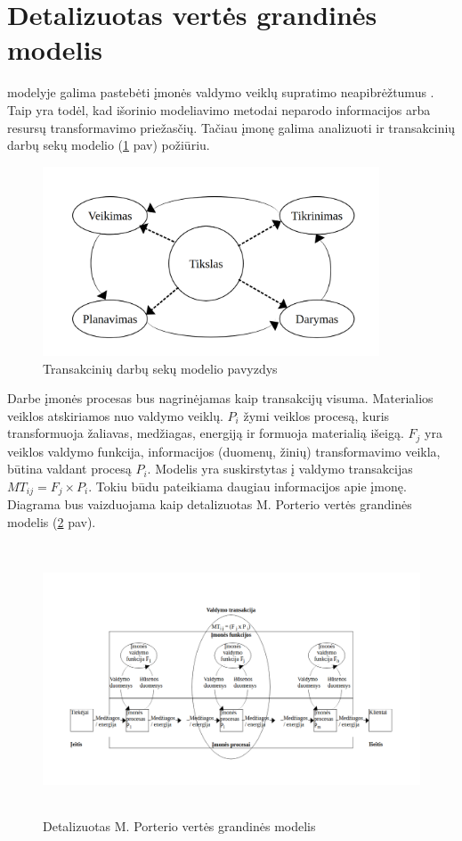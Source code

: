 \section{Detalizuotas vertės grandinės modelis} \label{section:dvcm}

\BPMN modelyje galima pastebėti įmonės valdymo veiklų supratimo neapibrėžtumus \cite{bpmnPorterModel}. Taip yra todėl, kad išorinio modeliavimo metodai neparodo informacijos arba resursų transformavimo priežasčių. Tačiau įmonę galima analizuoti ir transakcinių darbų sekų modelio (\ref{img:pdca} pav) požiūriu.  
\begin{figure}[H]
	\centering
	\includegraphics[width=10cm]{img/pdca}
	\caption{Transakcinių darbų sekų modelio pavyzdys}
	\label{img:pdca}
\end{figure} 

Darbe įmonės procesas bus nagrinėjamas kaip transakcijų visuma. Materialios veiklos atskiriamos nuo valdymo veiklų. $P_i$ žymi veiklos procesą, kuris transformuoja žaliavas, medžiagas, energiją ir formuoja materialią išeigą. $F_j$ yra veiklos valdymo funkcija, informacijos (duomenų, žinių) transformavimo veikla, būtina valdant procesą $P_i$. Modelis yra suskirstytas į valdymo transakcijas $ MT_{ij} = F_j \times P_i$. Tokiu būdu pateikiama daugiau informacijos apie įmonę. Diagrama bus vaizduojama kaip detalizuotas M. Porterio vertės grandinės modelis (\ref{img:detalized_porter_vcm} pav).

\begin{figure}[H]
	\centering
	\includegraphics[height=8cm]{img/detalized_porter_vcm}
	\caption{Detalizuotas M. Porterio vertės grandinės modelis}
	\label{img:detalized_porter_vcm}
\end{figure} 

